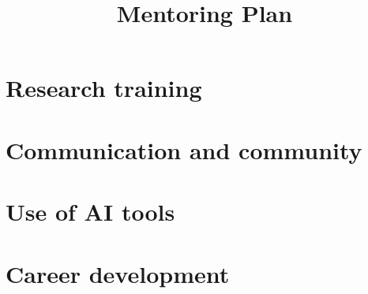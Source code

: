 \documentclass[11pt]{amsart}
\begin{document}
\title{Mentoring Plan}
\maketitle
\vspace{-0.8cm}


\section*{Research training}

\section*{Communication and community}

\section*{Use of AI tools}

\section*{Career development}
\end{document}
